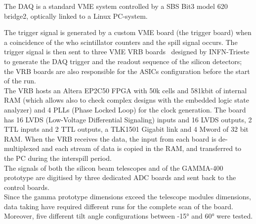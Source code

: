 The DAQ is a standard VME system controlled by a SBS Bit3 model 620 bridge2,
optically linked to a Linux PC-system. 

The trigger signal is generated by a custom VME board (the trigger board) when a
coincidence of the who scintillator counters and the spill signal occurs. The
trigger signal is then sent to three VME VRB boards~\cite{Berra2014422} designed
by INFN-Trieste to generate the DAQ trigger and the readout sequence of the
silicon detectors; the VRB boards are also responsible for the ASICs
configuration before the start of the run.\\
The VRB hosts an Altera EP2C50 FPGA with 50k cells and 581kbit of internal RAM
(which allows also to check complex designs with the embedded logic state
analyzer) and 4 PLLs (Phase Locked Loop) for the clock generation. The board has
16 LVDS (Low-Voltage Differential Signaling) inputs and 16 LVDS outputs, 2 TTL
inputs and 2 TTL outputs, a TLK1501 Gigabit link and 4 Mword of 32 bit RAM. When
the VRB receives the data, the input from each board is de-multiplexed and each
stream of data is copied in the RAM, and transferred to the PC during the
interspill period.\\
The signals of both the silicon beam telescopes and of the GAMMA-400 prototype
are digitised by three dedicated ADC boards and sent back to the control
boards.\\

Since the \gls{gamma} prototype dimensions exceed the telescope modules
dimensions, data taking have required different runs for the complete scan of
the board. Moreover, five different tilt angle configurations between
-15\si{\degree} and 60\si{\degree} were tested.


